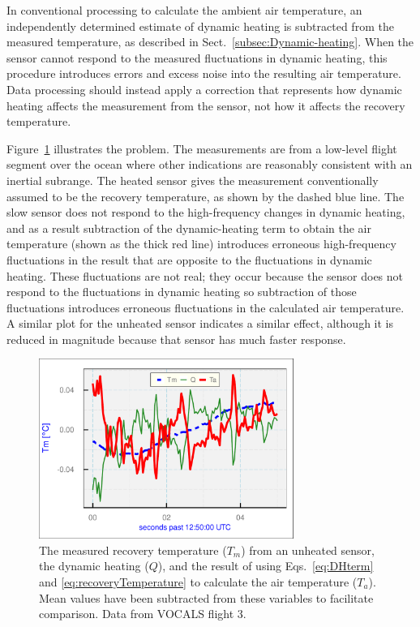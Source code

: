 \documentclass[amt, manuscript]{copernicus}
\begin{document}
In conventional processing to calculate the ambient air temperature, an
independently determined estimate of dynamic heating is subtracted from
the measured temperature, as described in
Sect.~\ref{subsec:Dynamic-heating}. When the sensor cannot respond to
the measured fluctuations in dynamic heating, this procedure introduces
errors and excess noise into the resulting air temperature. Data
processing should instead apply a correction that represents how dynamic
heating affects the measurement from the sensor, not how it affects the
recovery temperature.

Figure~\ref{fig:f5} illustrates the problem. The measurements are from a
low-level flight segment over the ocean where other indications are
reasonably consistent with an inertial subrange. The heated sensor gives
the measurement conventionally assumed to be the recovery temperature,
as shown by the dashed blue line. The slow sensor does not respond to
the high-frequency changes in dynamic heating, and as a result
subtraction of the dynamic-heating term to obtain the air temperature
(shown as the thick red line) introduces erroneous high-frequency
fluctuations in the result that are opposite to the fluctuations in
dynamic heating. These fluctuations are not real; they occur because the
sensor does not respond to the fluctuations in dynamic heating so
subtraction of those fluctuations introduces erroneous fluctuations in
the calculated air temperature. A similar plot for the unheated sensor
indicates a similar effect, although it is reduced in magnitude because
that sensor has much faster response.

\begin{figure}

\begin{center}\includegraphics[width=8.3cm]{figure/fig5} \end{center}
\caption{The measured recovery temperature ($T_m$) from an unheated sensor, the dynamic heating ($Q$), and the result of using Eqs.\ \eqref{eq:DHterm} and \eqref{eq:recoveryTemperature} to calculate the air temperature ($T_a$). Mean values have been subtracted from these variables to facilitate comparison. Data from VOCALS flight 3.\label{fig:f5}}
\end{figure}
\end{document}
